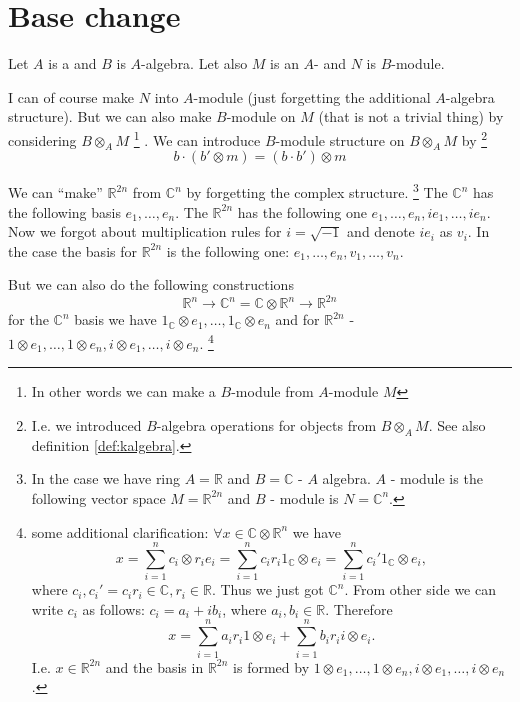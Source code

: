 \section{Base change}

Let $A$ is a  and $B$ is $A$-algebra. Let also $M$
is an $A$- and $N$ is $B$-module.

I can of course make $N$ into $A$-module (just forgetting the
additional $A$-algebra structure). But we can also make $B$-module on
$M$ (that is not a trivial thing) by considering $B \otimes_A M$
\footnote{
  In other words we can make a $B$-module from $A$-module $M$
}
.
We can introduce $B$-module structure on $B \otimes_A M$ by
\footnote{
  I.e. we introduced $B$-algebra operations for objects from
  $B \otimes_A M$. See also definition \ref{def:kalgebra}.
}
\[
b \cdot \left(b' \otimes m \right) = \left( b \cdot b' \right) \otimes m 
\]

\begin{example}
  We can ``make'' $\mathbb{R}^{2n}$ from $\mathbb{C}^n$ by forgetting
  the complex structure.
  \footnote{
    In the case we have ring $A = \mathbb{R}$ and $B = \mathbb{C}$ -
    $A$ algebra. $A$ - module is the following vector space
    $M = \mathbb{R}^{2n}$ and $B$ - module is $N = \mathbb{C}^n$.
  }
  The $\mathbb{C}^n$ has the following basis $e_1, \dots, e_n$.
  The $\mathbb{R}^{2n}$ has the following one
  $e_1, \dots, e_n, i e_1, \dots, i e_n$. Now we forgot about
  multiplication rules for $i = \sqrt{-1}$ and denote $i e_i$ as
  $v_i$. In the case the basis for $\mathbb{R}^{2n}$ is the following
  one: $e_1, \dots, e_n, v_1, \dots, v_n$.

  But we can also do the following constructions
  \[
  \mathbb{R}^n \rightarrow
  \mathbb{C}^n = \mathbb{C} \otimes \mathbb{R}^n \rightarrow
  \mathbb{R}^{2n}
  \]
  for the $\mathbb{C}^n$ basis we have
  $1_{\mathbb{C}} \otimes e_1, \dots, 1_{\mathbb{C}} \otimes e_n$ and
  for
  $\mathbb{R}^{2n}$ -
  $1 \otimes e_1, \dots, 1 \otimes e_n, i \otimes e_1, \dots, i
  \otimes e_n$.
  \footnote{
    some additional clarification:
    $\forall x \in \mathbb{C} \otimes \mathbb{R}^n$ we have
    \[
    x = \sum_{i=1}^n c_i \otimes r_i e_i =
    \sum_{i=1}^n c_i r_i 1_{\mathbb{C}} \otimes e_i =
    \sum_{i=1}^n c_i' 1_{\mathbb{C}} \otimes e_i,
    \]
    where $c_i,c_i'=c_i r_i \in \mathbb{C}, r_i \in \mathbb{R}$. Thus
    we just got $\mathbb{C}^n$. 
    From other side we can write $c_i$
    as follows: $c_i = a_i + i b_i$, where $a_i, b_i \in \mathbb{R}$.
    Therefore
    \[
    x = \sum_{i=1}^n a_i r_i 1 \otimes e_i + \sum_{i=1}^n b_i r_i i \otimes e_i.
    \]
    I.e. $x \in \mathbb{R}^{2n}$ and the basis in $\mathbb{R}^{2n}$ is
    formed by $1 \otimes e_1, \dots, 1 \otimes e_n, i \otimes e_1,
    \dots, i \otimes e_n$.
  }

\end{example}

